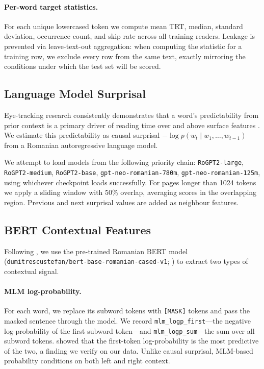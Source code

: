 \documentclass[12pt]{article}
\begin{document}
\paragraph{Per-word target statistics.}
For each unique lowercased token we compute mean TRT, median, standard deviation, occurrence count, and skip rate across all training readers. Leakage is prevented via leave-text-out aggregation: when computing the statistic for a training row, we exclude every row from the same text, exactly mirroring the conditions under which the test set will be scored.

\subsection{Language Model Surprisal}

Eye-tracking research consistently demonstrates that a word's predictability from prior context is a primary driver of reading time over and above surface features \cite{hollenstein2021multilingual}. We estimate this predictability as causal surprisal $-\log p(w_t \mid w_1, \ldots, w_{t-1})$ from a Romanian autoregressive language model.

We attempt to load models from the following priority chain: \texttt{RoGPT2-large}, \texttt{RoGPT2-medium}, \texttt{RoGPT2-base}, \texttt{gpt-neo-romanian-780m}, \texttt{gpt-neo-romanian-125m}, using whichever checkpoint loads successfully. For pages longer than 1024 tokens we apply a sliding window with 50\% overlap, averaging scores in the overlapping region. Previous and next surprisal values are added as neighbour features.

\subsection{BERT Contextual Features}
\label{sec:bert}

Following \citet{hodivoianu2025predicting}, we use the pre-trained Romanian BERT model (\texttt{dumitrescustefan/bert-base-romanian-cased-v1}; \citealt{dumitrescu2020birth}) to extract two types of contextual signal.

\paragraph{MLM log-probability.}
For each word, we replace its subword tokens with \texttt{[MASK]} tokens and pass the masked sentence through the model. We record \texttt{mlm\_logp\_first}---the negative log-probability of the first subword token---and \texttt{mlm\_logp\_sum}---the sum over all subword tokens. \citeauthor{hodivoianu2025predicting} showed that the first-token log-probability is the most predictive of the two, a finding we verify on our data. Unlike causal surprisal, MLM-based probability conditions on both left and right context.
\end{document}
